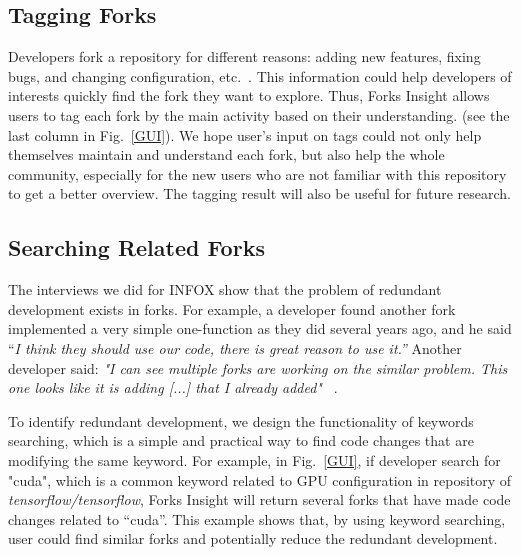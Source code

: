 \subsection{Tagging Forks}
%
Developers fork a repository for different reasons: adding new features, fixing bugs, and changing configuration, etc.~\cite{Mikkonen2011,Robles2012,dubinsky2013exploratory,stanciulescu2015forked}.
%
This information could help developers of interests quickly find the fork they want to explore.
%
Thus, Forks Insight allows users to tag each fork by the main activity based on their understanding.
(see the last column in Fig.~\ref{GUI}).  
 We hope user's input on tags could not only help themselves maintain and understand each fork, but also help the whole community, especially for the new users who are not familiar with this repository to get a better overview. The tagging result will also be useful for future research.
 
\subsection{Searching Related Forks}

The interviews we did for INFOX show that the problem of redundant development exists in forks. For example, a developer found another fork implemented a very simple one-function as they did several years ago, and he said ``\emph{I think they should use our code, there is great reason to use it.''} Another developer said: \emph{"I can see multiple forks are working on the similar problem. This one looks like it is adding [...] that I already added"} ~\cite{ZSLXWK:ICSE18}.

To identify redundant development, we design the functionality of keywords searching, which is a simple and practical way to find code changes that are modifying the same keyword. For example, in Fig.~\ref{GUI}, if developer search for "cuda", which is a common keyword related to GPU configuration in repository of \emph{tensorflow/tensorflow}, Forks Insight will return several forks that have made code changes related to ``cuda''. This example shows that, by using keyword searching, user could find similar forks and potentially reduce the redundant development.

\iffalse
\begin{figure}[H] 
\centering
\texttt{[image: shot2.png]}
\caption{An example of searching for similar forks.}
\vspace{-10pt}

\end{figure}
\fi

